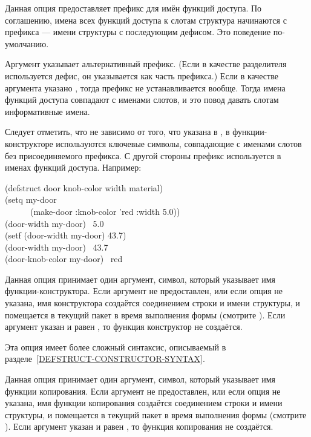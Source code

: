 \begin{flushdesc}

\item[\cd{:conc-name}]
Данная опция предоставляет префикс для имён функций доступа.
По соглашению, имена всех функций доступа к слотам структура начинаются с
префикса --- имени структуры с последующим дефисом. Это поведение
по-умолчанию.

Аргумент  указывает альтернативный префикс. (Если в качестве
разделителя используется дефис, он указывается как часть префикса.)
Если в качестве аргумента указано {\false}, тогда префикс не устанавливается
вообще.
Тогда имена функций доступа совпадают с именами слотов, и это повод давать
слотам информативные имена. 

Следует отметить, что не зависимо от того, что указана в , в
функции-конструкторе используются ключевые символы, совпадающие с именами
слотов без присоединяемого префикса.
С другой стороны префикс используется в именах функций доступа. Например:
\begin{lisp}
(defstruct door knob-color width material) \\
(setq my-door \\
~~~~~~(make-door :knob-color 'red :width 5.0)) \\
(door-width my-door) \EV\ 5.0 \\
(setf (door-width my-door) 43.7) \\
(door-width my-door) \EV\ 43.7 \\
(door-knob-color my-door) \EV\ red
\end{lisp}

\item[\cd{:constructor}]
Данная опция принимает один аргумент, символ, который указывает имя функции-конструктора. Если аргумент не предоставлен, или если опция не указана, имя
конструктора создаётся соединением строки  и имени структуры, и
помещается в текущий пакет в время выполнения формы  (смотрите
).
Если аргумент указан и равен {\false}, то функция конструктор не создаётся.

Эта опция имеет более сложный синтаксис, описываемый в
разделе~\ref{DEFSTRUCT-CONSTRUCTOR-SYNTAX}.

\item[\cd{:copier}]
Данная опция принимает один аргумент, символ, который указывает имя функции
копирования. Если аргумент не предоставлен, или если опция не указана, имя
функции копирования создаётся соединением строки  и имени структуры, и
помещается в текущий пакет в время выполнения формы  (смотрите
).
Если аргумент указан и равен {\false}, то функция копирования не создаётся.


\end{flushdesc}
